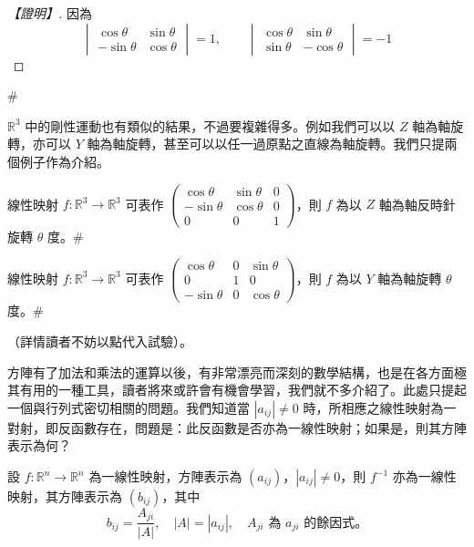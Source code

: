 \begin{proof}[【證明】]
因為
\[ \begin{vmatrix} \cos\theta & \sin\theta \\ -\sin\theta & \cos\theta \end{vmatrix} = 1, \qquad \begin{vmatrix} \cos\theta & \sin\theta \\ \sin\theta & -\cos\theta \end{vmatrix} = -1 \]
\end{proof}\hfill$\#$

$\mathbb{R}^3$ 中的剛性運動也有類似的結果，不過要複雜得多。例如我們可以以 $Z$ 軸為軸旋轉，亦可以 $Y$ 軸為軸旋轉，甚至可以以任一過原點之直線為軸旋轉。我們只提兩個例子作為介紹。

\begin{example}[*]\label{ex:b6s-1-38}
線性映射 $f: \mathbb{R}^3 \longrightarrow \mathbb{R}^3$ 可表作 $\begin{pmatrix} \cos\theta & \sin\theta & 0 \\ -\sin\theta & \cos\theta & 0 \\ 0 & 0 & 1 \end{pmatrix}$，則 $f$ 為以 $Z$ 軸為軸反時針旋轉 $\theta$ 度。\hfill$\#$
\end{example}

\begin{example}[*]\label{ex:b6s-1-39}
線性映射 $f: \mathbb{R}^3 \longrightarrow \mathbb{R}^3$ 可表作 $\begin{pmatrix} \cos\theta & 0 & \sin\theta \\ 0 & 1 & 0 \\ -\sin\theta & 0 & \cos\theta \end{pmatrix}$，則 $f$ 為以 $Y$ 軸為軸旋轉 $\theta$ 度。\hfill$\#$
\end{example}
（詳情讀者不妨以點代入試驗）。

方陣有了加法和乘法的運算以後，有非常漂亮而深刻的數學結構，也是在各方面極其有用的一種工具，讀者將來或許會有機會學習，我們就不多介紹了。此處只提起一個與行列式密切相關的問題。我們知道當 $|a_{ij}| \ne 0$ 時，所相應之線性映射為一對射，即反函數存在，問題是：此反函數是否亦為一線性映射；如果是，則其方陣表示為何？

\begin{theorem}\label{thm:b6s-1-21}
設 $f: \mathbb{R}^n \longrightarrow \mathbb{R}^n$ 為一線性映射，方陣表示為 $(a_{ij})$，$|a_{ij}| \ne 0$，則 $f^{-1}$ 亦為一線性映射，其方陣表示為 $(b_{ij})$，其中
\[ b_{ij} = \dfrac{A_{ji}}{|A|}, \quad |A| = |a_{ij}|, \quad A_{ji} \text{ 為 } a_{ji} \text{ 的餘因式。} \]
\end{theorem}

